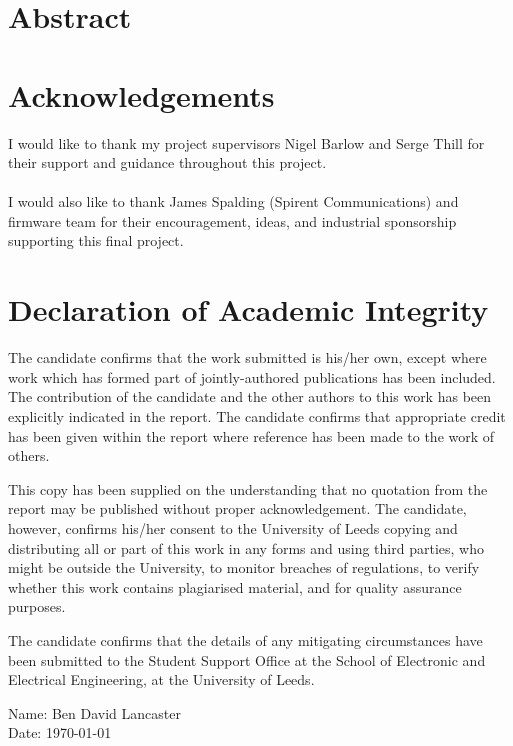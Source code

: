 \documentclass[11pt,a4paper]{report}
\begin{document}
\newpage
\chapter*{Abstract}
\lipsum[1-3]

\newpage
\chapter*{Acknowledgements}
I would like to thank my project supervisors Nigel Barlow and Serge Thill for their support and guidance throughout this project. 
\\\\
I would also like to thank James Spalding (Spirent Communications) and firmware team for their encouragement, ideas, and industrial sponsorship supporting this final project.



\chapter*{Declaration of Academic Integrity}

The candidate confirms that the work submitted is his/her own, except where work which has formed part of jointly-authored publications has been included. The contribution of the candidate and the other authors to this work has been explicitly indicated in the report. The candidate confirms that appropriate credit has been given within the report where reference has been made to the work of others.

This copy has been supplied on the understanding that no quotation from the report may be published without proper acknowledgement. The candidate, however, confirms his/her consent to the University of Leeds copying and distributing all or part of this work in any forms and using third parties, who might be outside the University, to monitor breaches of regulations, to verify whether this work contains plagiarised material, and for quality assurance purposes.

The candidate confirms that the details of any mitigating circumstances have been submitted to the Student Support Office at the School of Electronic and Electrical Engineering, at the University of Leeds.
\vfill

\noindent 
Name:	Ben David Lancaster \\
Date:	\today
\newpage
\end{document}
